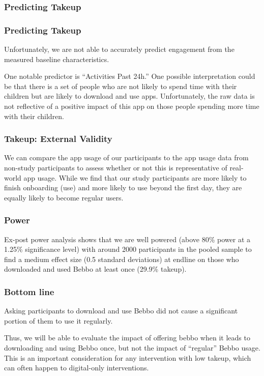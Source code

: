 \documentclass[aspectratio=169]{beamer}
\begin{document}
\begin{frame}[shrink=60]
  \frametitle{Predicting Takeup}


\end{frame}

\begin{frame}
  \frametitle{Predicting Takeup}
Unfortunately, we are not able to accurately predict engagement from the measured baseline characteristics.

One notable predictor is ``Activities Past 24h.'' One possible interpretation could be that there is a set of people who are not likely to spend time with their children but are likely to download and use apps. Unfortunately, the raw data is not reflective of a positive impact of this app on those people spending more time with their children.
\end{frame}



\begin{frame}[shrink=25]
  \frametitle{Takeup: External Validity}



We can compare the app usage of our participants to the app usage data from non-study participants to assess whether or not this is representative of real-world app usage. While we find that our study participants are more likely to finish onboarding (use) and more likely to use beyond the first day, they are equally likely to become regular users.

\end{frame}

\begin{frame}
  \frametitle{Power}

Ex-post power analysis shows that we are well powered (above 80\% power at a 1.25\% significance level) with around 2000 participants in the pooled sample to find a medium effect size (0.5 standard deviations) at endline on those who downloaded and used Bebbo at least once (29.9\% takeup).

\end{frame}

\begin{frame}
  \frametitle{Bottom line}

Asking participants to download and use Bebbo did not cause a significant portion of them to use it regularly.

Thus, we will be able to evaluate the impact of offering bebbo when it leads to downloading and using Bebbo once, but not the impact of ``regular'' Bebbo usage. This is an important consideration for any intervention with low takeup, which can often happen to digital-only interventions.

\end{frame}
\end{document}
